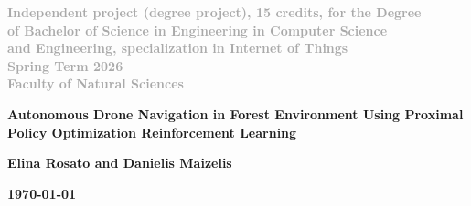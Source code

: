 \documentclass[../main.tex]{subfiles}
\begin{document}
  \raggedright
  \text{}\par\vspace{4cm}
    {\large\bfseries \textcolor{darkgray}{Independent project (degree project), 15 credits, for the Degree}}\\
    {\large\bfseries \textcolor{darkgray}{of Bachelor of Science in Engineering in Computer Science}}\\
    {\large\bfseries \textcolor{darkgray}{and Engineering, specialization in Internet of Things}}\\
    \vspace{2mm}
    {\large\bfseries \textcolor{darkgray}{Spring Term 2026}}\\
    \vspace{2mm}
    {\large\bfseries \textcolor{darkgray}{Faculty of Natural Sciences}}
    \vspace{1cm}

    {\LARGE\bfseries Autonomous Drone Navigation in Forest Environment Using Proximal Policy Optimization Reinforcement Learning\par}
    \vspace{1cm}

    {\large\bfseries Elina Rosato and Danielis Maizelis\par}
    \vspace{1cm}
    {\large\bfseries \today\par}
    \vfill
\end{document}
